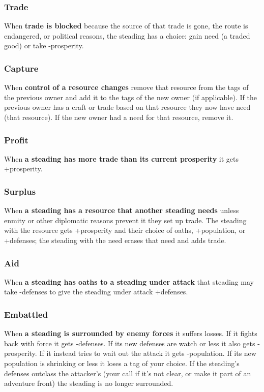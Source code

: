 \subsubsection{Trade}


 When \textbf{trade is blocked}
 because the source of that trade is gone, the route is endangered, or political reasons, the steading has a choice: gain need (a traded good) or take -prosperity.
\subsubsection{Capture}


 When \textbf{control of a resource changes}
 remove that resource from the tags of the previous owner and add it to the tags of the new owner (if applicable). If the previous owner has a craft or trade based on that resource they now have need (that resource). If the new owner had a need for that resource, remove it.
\subsubsection{Profit}


 When \textbf{a steading has more trade than its current prosperity}
 it gets +prosperity.
\subsubsection{Surplus}


 When \textbf{a steading has a resource that another steading needs}
 unless enmity or other diplomatic reasons prevent it they set up trade. The steading with the resource gets +prosperity and their choice of oaths, +population, or +defenses; the steading with the need erases that need and adds trade.
\subsubsection{Aid}


 When \textbf{a steading has oaths to a steading under attack}
 that steading may take -defenses to give the steading under attack +defenses.
\subsubsection{Embattled}


 When \textbf{a steading is surrounded by enemy forces}
 it suffers losses. If it fights back with force it gets -defenses. If its new defenses are watch or less it also gets -prosperity. If it instead tries to wait out the attack it gets -population. If its new population is shrinking or less it loses a tag of your choice. If the steading's defenses outclass the attacker's (your call if it's not clear, or make it part of an adventure front) the steading is no longer surrounded.
